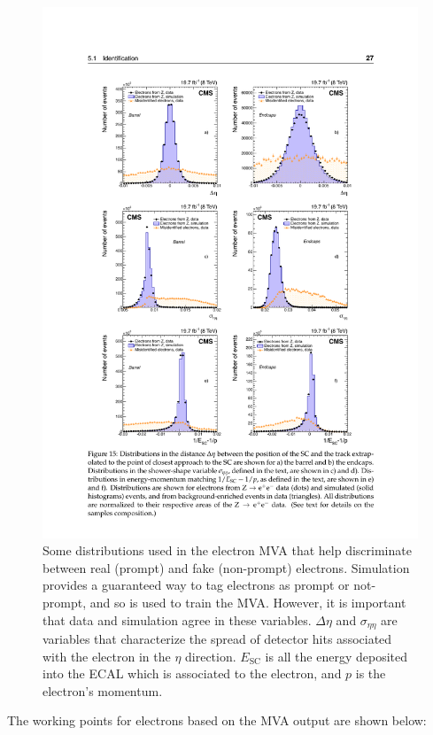     \begin{figure}[!h]
      \centering
      \includegraphics[width=.8\textwidth]{figures/electron_mva_discriminating_distributions.pdf}
      \caption[Some distributions used in the electron MVA that help discriminate between real (prompt) and fake (non-prompt) electrons.]{Some distributions used in the electron MVA that help discriminate between real (prompt) and fake (non-prompt) electrons. Simulation provides a guaranteed way to tag electrons as prompt or not-prompt, and so is used to train the MVA. However, it is important that data and simulation agree in these variables. $\Delta \eta$ and $\sigma_{\eta\eta}$ are variables that characterize the spread of detector hits associated with the electron in the $\eta$ direction. $E_\text{SC}$ is all the energy deposited into the ECAL which is associated to the electron, and $p$ is the electron's momentum.}
      \label{fig:electron_mva_discriminating_vars}
    \end{figure}

    The working points for electrons based on the MVA output are shown below:

